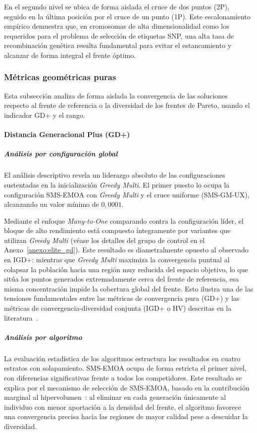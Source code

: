 En el segundo nivel se ubica de forma aislada el cruce de dos puntos (2P), seguido en la última posición por el cruce de un punto (1P). Este escalonamiento empírico demuestra que, en cromosomas de alta dimensionalidad como los requeridos para el problema de selección de etiquetas SNP, una alta tasa de recombinación genética resulta fundamental para evitar el estancamiento y alcanzar de forma integral el frente óptimo.

\subsubsection{Métricas geométricas puras}

Esta subsección analiza de forma aislada la convergencia de las soluciones respecto al frente de referencia o la diversidad de los frentes de Pareto, usando el indicador GD+ y el rango.

\paragraph{Distancia Generacional Plus (GD+)}

\subparagraph{Análisis por configuración global}

El análisis descriptivo revela un liderazgo absoluto de las configuraciones sustentadas en la inicialización \textit{Greedy Multi}. El primer puesto lo ocupa la configuración SMS-EMOA con \textit{Greedy Multi} y el cruce uniforme (SMS-GM-UX), alcanzando un valor mínimo de $0{,}0001$.

Mediante el enfoque \textit{Many-to-One} comparando contra la configuración líder, el bloque de alto rendimiento está compuesto íntegramente por variantes que utilizan \textit{Greedy Multi} (véase los detalles del grupo de control en el Anexo~\ref{anexo:elite_gd}). Este resultado es diametralmente opuesto al observado en IGD+: mientras que \textit{Greedy Multi} maximiza la convergencia puntual al colapsar la población hacia una región muy reducida del espacio objetivo, lo que sitúa los puntos generados extremadamente cerca del frente de referencia, esa misma concentración impide la cobertura global del frente. Esto ilustra una de las tensiones fundamentales entre las métricas de convergencia pura (GD+) y las métricas de convergencia-diversidad conjunta (IGD+ o HV) descritas en la literatura~\cite{ishibuchi2018modified}.

\subparagraph{Análisis por algoritmo}

La evaluación estadística de los algoritmos estructura los resultados en cuatro estratos con solapamiento. SMS-EMOA ocupa de forma estricta el primer nivel, con diferencias significativas frente a todos los competidores. Este resultado se explica por el mecanismo de selección de SMS-EMOA, basado en la contribución marginal al hipervolumen~\cite{beume2007sms}: al eliminar en cada generación únicamente al individuo con menor aportación a la densidad del frente, el algoritmo favorece una convergencia precisa hacia las regiones de mayor calidad pese a descuidar la diversidad.

